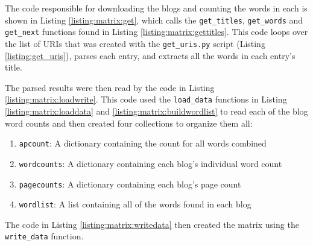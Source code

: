 The code responsible for downloading the blogs and counting the words in each is shown in Listing \ref{listing:matrix:get}, which calls the {\tt get\_titles}, {\tt get\_words} and {\tt get\_next} functions found in Listing \ref{listing:matrix:gettitles}. This code loops over the list of URIs that was created with the {\tt get\_uris.py} script (Listing \ref{listing:get_uris}), parses each entry, and extracts all the words in each entry's title. 



\clearpage



The parsed results were then read by the code in Listing \ref{listing:matrix:loadwrite}. This code used the {\tt load\_data} functions in Listing \ref{listing:matrix:loaddata} and \ref{listing:matrix:buildwordlist} to read each of the blog word counts and then created four collections to organize them all:

\begin{enumerate}
	\item {\tt apcount}: A dictionary containing the count for all words combined
	\item {\tt wordcounts}: A dictionary containing each blog's individual word count
	\item {\tt pagecounts}: A dictionary containing each blog's page count
	\item {\tt wordlist}: A list containing all of the words found in each blog
\end{enumerate}



\clearpage





The code in Listing \ref{listing:matrix:writedata} then created the matrix using the {\tt write\_data} function.

